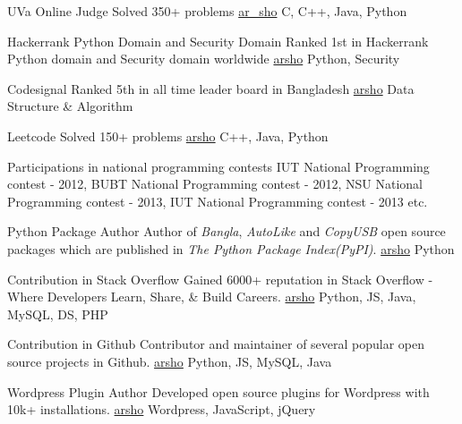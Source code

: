 \documentclass[10pt,a4paper]{altacv}
\begin{document}
\medskip

\medskip

\cvprogramming
{UVa Online Judge}
{Solved 350+ problems}
{\href{https://uhunt.onlinejudge.org/id/141799}{ar\_sho}}
{C, C++, Java, Python}
\divider

\cvprogramming
{Hackerrank Python Domain and Security Domain}
{Ranked 1st in Hackerrank Python domain and Security domain worldwide}
{\href{https://www.hackerrank.com/leaderboard?filter=arsho&filter_on=hacker&page=1&track=python&type=practice}{arsho}}
{Python, Security}
\divider

\cvprogramming
{Codesignal}
{Ranked 5th in all time leader board in Bangladesh}
{\href{https://app.codesignal.com/leaderboard/?type=individual&period=total&country=BD}{arsho}}
{Data Structure \& Algorithm}
\divider

\cvprogramming
{Leetcode}
{Solved 150+ problems}
{\href{https://leetcode.com/arsho/}{arsho}}
{C++, Java, Python}
\divider

\cvonsitecontest
{Participations in national programming contests}
{IUT National Programming
contest - 2012, BUBT National Programming
contest - 2012, NSU National Programming
contest - 2013, IUT National Programming
contest - 2013 etc.}

\medskip

\cvprogramming
{Python Package Author}
{Author of \textit{Bangla}, \textit{AutoLike} and \textit{CopyUSB} open source packages which are published in \textit{The Python Package Index(PyPI)}.}
{\href{https://pypi.org/user/arsho/}{arsho}}
{Python}
\divider

\cvprogramming
{Contribution in Stack Overflow}
{Gained 6000+ reputation in Stack Overflow - Where Developers Learn, Share, \& Build Careers.}
{\href{https://stackoverflow.com/users/3129414/arsho}{arsho}}
{Python, JS, Java, MySQL, DS, PHP}
\divider

\cvprogramming
{Contribution in Github}
{Contributor and maintainer of several popular open source projects in Github.}
{\href{https://github.com/arsho/}{arsho}}
{Python, JS, MySQL, Java}

\divider

\cvprogramming
{Wordpress Plugin Author}
{Developed open source plugins for Wordpress with 10k+ installations.}
{\href{https://profiles.wordpress.org/arsho/}{arsho}}
{Wordpress, JavaScript, jQuery}
\end{document}
